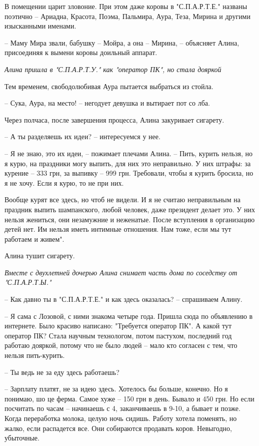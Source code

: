 В помещении царит зловоние. При этом даже коровы в "С.П.А.Р.Т.Е." названы
поэтично – Ариадна, Красота, Поэма, Пальмира, Аура, Теза, Мирина и другими
изысканными именами.

– Маму Мира звали, бабушку – Мойра, а она – Мирина, – объясняет Алина,
присоединяя к вымени коровы доильный аппарат.

\emph{Алина пришла в "С.П.А.Р.Т.У." как "оператор ПК", но стала дояркой}

Тем временем, свободолюбивая Аура пытается выбраться из стойла.

– Сука, Аура, на место! – негодует девушка и вытирает пот со лба.

Через полчаса, после завершения процесса, Алина закуривает сигарету.

– А ты разделяешь их идеи? – интересуемся у нее.

– Я не знаю, это их идеи, – пожимает плечами Алина. – Пить, курить нельзя, но я
курю, на праздники могу выпить, для них это неправильно. У них штрафы: за
курение – 333 грн, за выпивку – 999 грн. Требовали, чтобы я курить бросила, но
я не хочу. Если я курю, то не при них. 

Вообще курят все здесь, но чтоб не видели. И я не считаю неправильным на
праздник выпить шампанского, любой человек, даже президент делает это. У них
нельзя жениться, они незамужние и неженатые. После вступления в организацию
детей нет. Им нельзя иметь интимные отношения. Нам тоже, если мы тут работаем и
живем".

Алина тушит сигарету.

\emph{Вместе с двухлетней дочерью Алина снимает часть дома по соседству от "С.П.А.Р.Т.Ы."}

– Как давно ты в "С.П.А.Р.Т.Е." и как здесь оказалась? – спрашиваем Алину.

– Я сама с Лозовой, с ними знакома четыре года. Пришла сюда по объявлению в
интернете. Было красиво написано: "Требуется оператор ПК". А какой тут оператор
ПК? Стала научным технологом, потом пастухом, последний год работаю дояркой,
потому что не было людей – мало кто согласен с тем, что нельзя пить-курить.

– Ты ведь не за еду здесь работаешь?

– Зарплату платят, не за идею здесь. Хотелось бы больше, конечно. Но я понимаю,
шо це ферма. Самое хуже – 150 грн в день. Бывало и 450 грн. Но если посчитать
по часам – начинаешь с 4, заканчиваешь в 9-10, а бывает и позже. Когда
переработка молока, целую ночь сидишь. Работу хотела поменять, но жалко, если
распадется все. Они собираются продавать коров. Невыгодно, убыточные.

